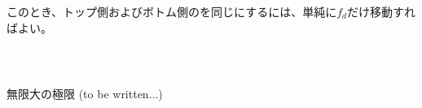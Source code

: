 このとき、トップ側およびボトム側の\AlocationLength を同じにするには、単純に$f_d$だけ移動すればよい。

~\vfill
\begin{Column}{\CenterCurvatureRadius 無限大の極限\TBW}
(to be written...)
\end{Column}
